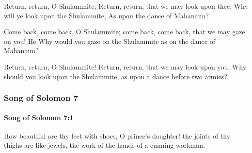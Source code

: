 			\begin{versebox}
					\item[BHS] 
					\item[ASV] Return, return, O Shulammite; Return, return, that we may look upon thee. Why will ye look upon the Shulammite, As upon the dance of Mahanaim?
					\item[NIV] Come back, come back, O Shulammite; come back, come back, that we may gaze on you! He Why would you gaze on the Shulammite as on the dance of Mahanaim?
					\item[NRSV] Return, return, O Shulammite! Return, return, that we may look upon you. Why should you look upon the Shulammite, as upon a dance before two armies?
			\end{versebox}
	\subsubsection{Song of Solomon 7} %
		\label{SONGOFSOLOMON-7}

		\paragraph{Song of Solomon 7:1} %
			\label{SONGOFSOLOMON-7-1}

			How beautiful are thy feet with shoes, O prince’s daughter! the joints of thy thighs are like jewels, the work of the hands of a cunning workman.

